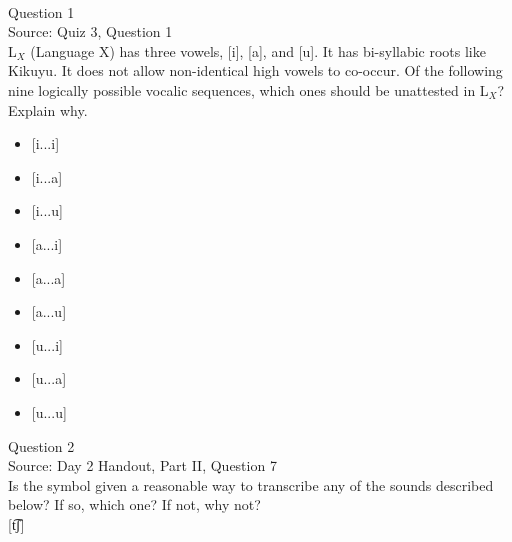 \documentclass[12pt]{article}
\begin{document}
\newpage

\begin{center}
\textbf{{\color{red}{\HUGE END OF EXAM}}}\\

\end{center}
\newpage

\begin{center}
\textbf{{\color{blue}{\HUGE START OF EXAM\\}}}

\textbf{{\color{blue}{\HUGE Student ID: 9450\\}}}

\textbf{{\color{blue}{\HUGE 4:15 - 4:30 PM\\}}}

\end{center}
\newpage

{\large Question 1}\\

Source: Quiz 3, Question 1\\

L$_X$ (Language X) has three vowels, [i], [a], and [u]. It has bi-syllabic roots like Kikuyu. It does not allow non-identical high vowels to co-occur. Of the following nine logically possible vocalic sequences, which ones should be unattested in L$_X$? Explain why.\\

\begin{itemize} \item {[i...i]} \item {[i...a]} \item {[i...u]} \item {[a...i]} \item {[a...a]} \item {[a...u]} \item {[u...i]} \item {[u...a]} \item {[u...u]} \end{itemize}


\newpage

{\large Question 2}\\

Source: Day 2 Handout, Part II, Question 7\\

Is the symbol given a reasonable way to transcribe any of the sounds described below? If so, which one? If not, why not?\\

{[t͡ʃ]}
\end{document}
